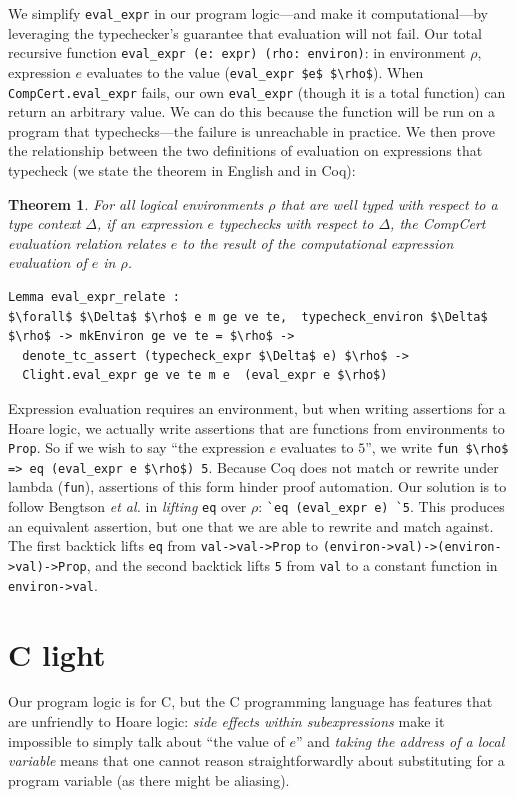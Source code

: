 \documentclass{puthesis}
\begin{document}
We simplify \lstinline|eval_expr| in our program logic---and make it
computational---by leveraging the typechecker's guarantee that
evaluation will not fail.  Our total recursive function
\lstinline|eval_expr (e: expr) (rho: environ)|: in environment $\rho$,
expression $e$ evaluates to the value 
(\lstinline|eval_expr $e$ $\rho$|).  When \lstinline{CompCert.eval_expr} fails, our own
\lstinline{eval_expr} (though it is a total function) can return an
arbitrary value.  We can do this because the function will be run on a
program that typechecks---the failure is unreachable in practice. We
then prove the relationship between the two definitions of evaluation
on expressions that typecheck (we state the theorem in English and in
Coq):
\newtheorem{eval_expr_relate}{Theorem}
\begin{eval_expr_relate}
For all logical environments $\rho$ that are well typed with respect to a type
context $\Delta$, if an expression $e$ typechecks with respect to $\Delta$, the
CompCert evaluation relation relates $e$ to the result of the computational
expression evaluation of $e$ in $\rho$. 
\end{eval_expr_relate}

\begin{lstlisting}
Lemma eval_expr_relate :
$\forall$ $\Delta$ $\rho$ e m ge ve te,  typecheck_environ $\Delta$ $\rho$ -> mkEnviron ge ve te = $\rho$ ->
  denote_tc_assert (typecheck_expr $\Delta$ e) $\rho$ ->
  Clight.eval_expr ge ve te m e  (eval_expr e $\rho$)
\end{lstlisting}

Expression evaluation requires an environment, but when writing
assertions for a Hoare logic, we actually write assertions that are
functions from environments to \lstinline|Prop|. So if we wish to say
``the expression $e$ evaluates to $5$'', we write 
\lstinline|fun $\rho$ => eq (eval_expr e $\rho$) 5|.  Because Coq does not match or
rewrite under lambda (\lstinline|fun|), assertions of this form hinder
proof automation.  Our solution is to follow Bengtson \emph{et al.}
\cite{bengtson12} in \emph{lifting} \lstinline|eq| over $\rho$:
\lstinline|`eq (eval_expr e) `5|.  This produces an equivalent
assertion, but one that we are able to rewrite and match against. The
first backtick lifts \lstinline|eq| from \lstinline{val->val->Prop} to
\lstinline{(environ->val)->(environ->val)->Prop}, and the second
backtick lifts \lstinline{5} from \lstinline{val} to a constant
function in \lstinline{environ->val}.


\section{C light}
\label{sec:clight}
Our program logic is for C, but the C programming language has features that are
unfriendly to Hoare logic: \emph{side effects within subexpressions} 
make it impossible to simply talk about ``the value of $e$''  and \emph{taking
the address of a local variable} means that one cannot reason straightforwardly about
substituting for a program variable
(as there might be aliasing).
\end{document}

